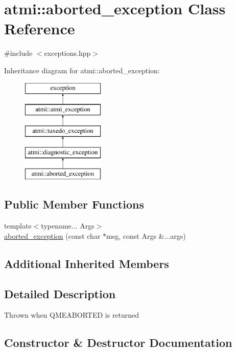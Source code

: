 \hypertarget{classatmi_1_1aborted__exception}{}\section{atmi\+:\+:aborted\+\_\+exception Class Reference}
\label{classatmi_1_1aborted__exception}


{\ttfamily \#include $<$exceptions.\+hpp$>$}

Inheritance diagram for atmi\+:\+:aborted\+\_\+exception\+:\begin{figure}[H]
\begin{center}
\leavevmode
\includegraphics[height=5.000000cm]{classatmi_1_1aborted__exception}
\end{center}
\end{figure}
\subsection*{Public Member Functions}
\begin{DoxyCompactItemize}
\item 
{\footnotesize template$<$typename... Args$>$ }\\\hyperlink{classatmi_1_1aborted__exception_ab2a2defdbafa60f2566c55a078bc502a}{aborted\+\_\+exception} (const char $\ast$msg, const Args \&...args)
\end{DoxyCompactItemize}
\subsection*{Additional Inherited Members}


\subsection{Detailed Description}
Thrown when Q\+M\+E\+A\+B\+O\+R\+T\+E\+D is returned 

\subsection{Constructor \& Destructor Documentation}
\hypertarget{classatmi_1_1aborted__exception_ab2a2defdbafa60f2566c55a078bc502a}{}
